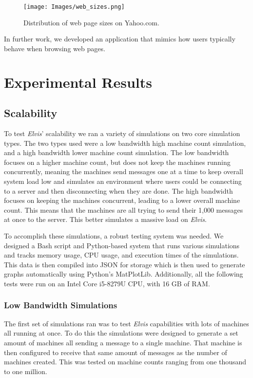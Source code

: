 \documentclass[journal]{IEEEtran} %
\newcommand{\imagewidth}{0.45\textwidth}
\newcommand{\elvis}{\textit{Elvis}}
\begin{document}
\begin{figure}[htbp]
    \centerline{\texttt{[image: Images/web\_sizes.png]}}
    \caption{Distribution of web page sizes on Yahoo.com.}
    \label{fig:websize}
\end{figure}

In further work, we developed an application that mimics how users typically behave when browsing web pages.

\section{Experimental Results}

\subsection{Scalability}

To test \elvis{}' scalability we ran a variety of simulations on two core simulation types. The two types used were a low bandwidth high machine count simulation, and a high bandwidth lower machine count simulation. The low bandwidth focuses on a higher machine count, but does not keep the machines running concurrently, meaning the machines send messages one at a time to keep overall system load low and simulates an environment where users could be connecting to a server and then disconnecting when they are done. The high bandwidth focuses on keeping the machines concurrent, leading to a lower overall machine count. This means that the machines are all trying to send their 1,000 messages at once to the server. This better simulates a massive load on \elvis{}.

To accomplish these simulations, a robust testing system was needed. We designed a Bash script and Python-based system that runs various simulations and tracks memory usage, CPU usage, and execution times of the simulations. This data is then compiled into JSON for storage which is then used to generate graphs automatically using Python’s MatPlotLib. Additionally, all the following tests were run on an Intel Core i5-8279U CPU, with 16 GB of RAM.

\subsubsection{Low Bandwidth Simulations}

The first set of simulations ran was to test \elvis{} capabilities with lots of machines all running at once. To do this the simulations were designed to generate a set amount of machines all sending a message to a single machine. That machine is then configured to receive that same amount of messages as the number of machines created. This was tested on machine counts ranging from one thousand to one million.
\end{document}

